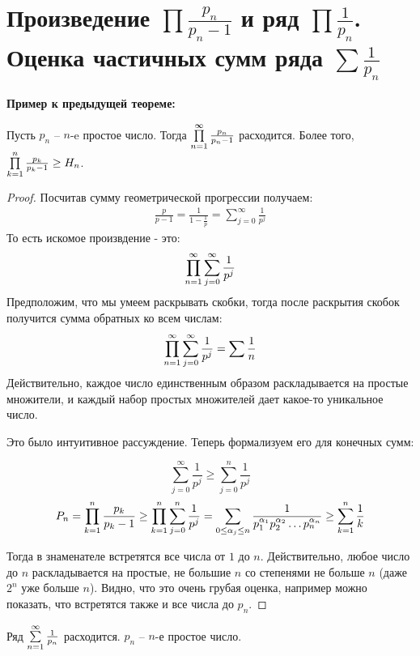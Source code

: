 \section{Произведение $\prod \frac{p_n}{p_n - 1}$ и ряд $\prod \frac{1}{p_n}$. Оценка частичных сумм ряда $\sum \frac{1}{p_n}$}
\textbf{Пример к предыдущей теореме:}

Пусть $p_n$ -- $n$-e простое число. Тогда $\prod \limits_{n=1}^\infty \frac{p_n}{p_n - 1}$ расходится.
Более того, $\prod \limits_{k=1}^n \frac{p_k}{p_k - 1} \geq H_n$.

\begin{proof}
    Посчитав сумму геометрической прогрессии получаем:
    \begin{gather*}
        \frac{p}{p-1} = \frac{1}{1-\frac{1}{p}} = \sum \limits_{j=0}^\infty \frac{1}{p^j}
    \end{gather*}
    То есть искомое произвдение - это:
    \begin{gather*}
        \prod \limits_{n=1}^\infty \sum \limits_{j=0}^\infty \frac{1}{p^j}
    \end{gather*}
    Предположим, что мы умеем раскрывать скобки, тогда после раскрытия скобок получится сумма обратных ко всем числам:
    \begin{gather*}
        \prod \limits_{n=1}^\infty \sum \limits_{j=0}^\infty \frac{1}{p^j} = \sum \frac{1}{n}
    \end{gather*}
    Действительно, каждое число единственным образом раскладывается на простые множители, и каждый набор простых множителей дает какое-то уникальное число.

    Это было интуитивное рассуждение. Теперь формализуем его для конечных сумм:

    \[\sum \limits_{j=0}^\infty \frac{1}{p^j} \geq \sum \limits_{j=0}^n \frac{1}{p^j}\]
    \[P_n = \prod \limits_{k=1}^n \frac{p_k}{p_k - 1} \geq \prod \limits_{k=1}^n \sum \limits_{j=0}^n \frac{1}{p^j} = 
    \sum_{0 \leq \alpha_j \leq n} \frac{1}{p_1^{\alpha_1}p_2^{\alpha_2}\ldots p_n^{\alpha_n}} \geq \sum \limits_{k=1}^n \frac{1}{k} \]

    Тогда в знаменателе встретятся все числа от $1$ до $n$. Действительно, любое число до $n$ раскладывается на простые,
    не большие $n$ со степенями не больше $n$ (даже $2^n$ уже больше $n$). Видно, что это очень грубая оценка, например можно
    показать, что встретятся также и все числа до $p_n$.
\end{proof}

\begin{theorem}
    Ряд $\sum \limits_{n=1}^\infty \frac{1}{p_n}$ расходится. $p_n$ -- $n$-е простое число.
\end{theorem}

